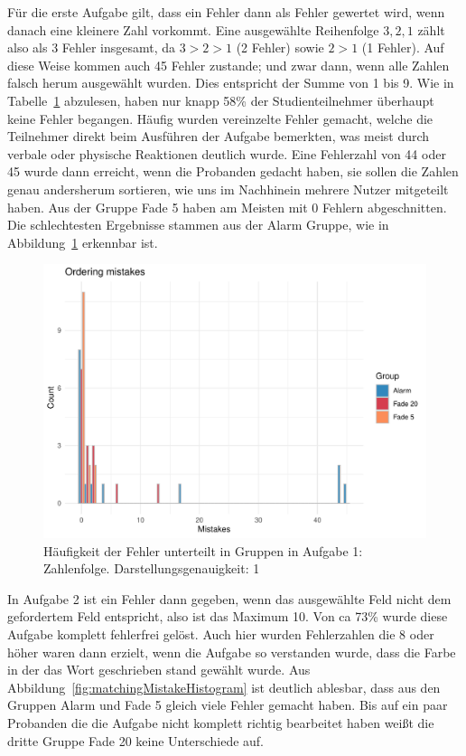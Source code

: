 Für die erste Aufgabe gilt, dass ein Fehler dann als Fehler gewertet wird, wenn danach eine kleinere Zahl vorkommt. Eine ausgewählte Reihenfolge $3, 2, 1$ zählt also als 3 Fehler insgesamt, da $3 > 2 > 1$ (2 Fehler) sowie $2 > 1$ (1 Fehler). Auf diese Weise kommen auch 45 Fehler zustande; und zwar dann, wenn alle Zahlen falsch herum ausgewählt wurden. Dies entspricht der Summe von 1 bis 9.
Wie in Tabelle~\ref{fig:orderingMistakeHistogram} abzulesen, haben nur knapp 58\% der Studienteilnehmer überhaupt keine Fehler begangen. Häufig wurden vereinzelte Fehler gemacht, welche die Teilnehmer direkt beim Ausführen der Aufgabe bemerkten, was meist durch verbale oder physische Reaktionen deutlich wurde. 
Eine Fehlerzahl von 44 oder 45 wurde dann erreicht, wenn die Probanden gedacht haben, sie sollen die Zahlen genau andersherum sortieren, wie uns im Nachhinein mehrere Nutzer mitgeteilt haben.
Aus der Gruppe Fade 5 haben am Meisten mit 0 Fehlern abgeschnitten. Die schlechtesten Ergebnisse stammen aus der Alarm Gruppe, wie in Abbildung~\ref{fig:orderingMistakeHistogram} erkennbar ist. 

\begin{figure}[H]
	\centering
	\includegraphics[width=\textwidth]{./_StudyResults/orderingMisHist}
	\caption{Häufigkeit der Fehler unterteilt in Gruppen in Aufgabe 1: Zahlenfolge. Darstellungsgenauigkeit: 1}
	\label{fig:orderingMistakeHistogram}
\end{figure}

In Aufgabe 2 ist ein Fehler dann gegeben, wenn das ausgewählte Feld nicht dem gefordertem Feld entspricht, also ist das Maximum 10.
Von ca 73\% wurde diese Aufgabe komplett fehlerfrei gelöst.
Auch hier wurden Fehlerzahlen die 8 oder höher waren dann erzielt, wenn die Aufgabe so verstanden wurde, dass die Farbe in der das Wort geschrieben stand gewählt wurde.
Aus Abbildung~\ref{fig:matchingMistakeHistogram} ist deutlich ablesbar, dass aus den Gruppen Alarm und Fade 5 gleich viele Fehler gemacht haben. Bis auf ein paar Probanden die die Aufgabe nicht komplett richtig bearbeitet haben weißt die dritte Gruppe Fade 20 keine Unterschiede auf.

